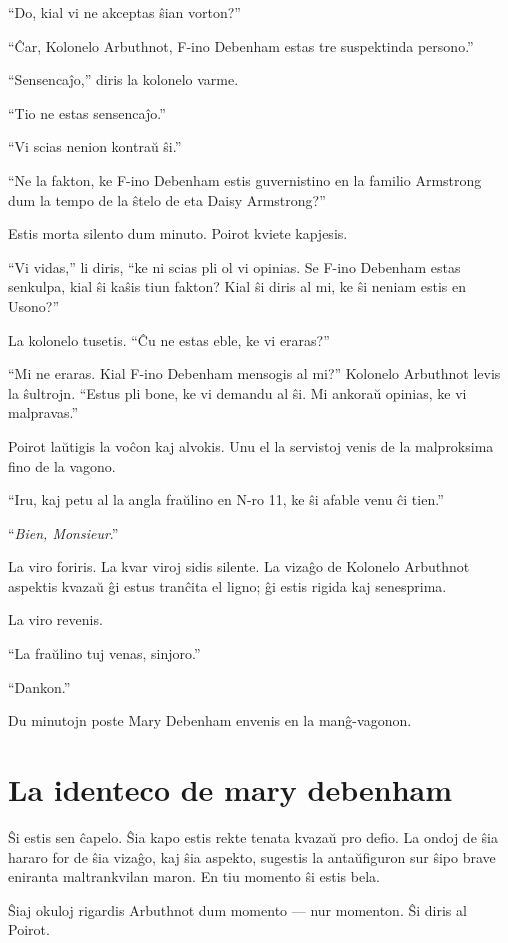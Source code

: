 ``Do, kial vi ne akceptas ŝian vorton?''

``Ĉar, Kolonelo Arbuthnot, F-ino Debenham estas tre suspektinda persono.''

``Sensencaĵo,'' diris la kolonelo varme.

``Tio ne estas sensencaĵo.''

``Vi scias nenion kontraŭ ŝi.''

``Ne la fakton, ke F-ino Debenham estis guvernistino en la familio Armstrong dum la tempo de la ŝtelo de eta Daisy Armstrong?''

Estis morta silento dum minuto. Poirot kviete kapjesis.

``Vi vidas,'' li diris, ``ke ni scias pli ol vi opinias. Se F-ino Debenham estas senkulpa, kial ŝi kaŝis tiun fakton? Kial ŝi diris al mi, ke ŝi neniam estis en Usono?''

La kolonelo tusetis. ``Ĉu ne estas eble, ke vi eraras?''

``Mi ne eraras. Kial F-ino Debenham mensogis al mi?'' Kolonelo Arbuthnot levis la ŝultrojn. ``Estus pli bone, ke vi demandu al ŝi. Mi ankoraŭ opinias, ke vi malpravas.''

Poirot laŭtigis la voĉon kaj alvokis. Unu el la servistoj venis de la malproksima fino de la vagono.

``Iru, kaj petu al la angla fraŭlino en N-ro 11, ke ŝi afable venu ĉi tien.''

``\emph{Bien, Monsieur}.''

La viro foriris. La kvar viroj sidis silente. La vizaĝo de Kolonelo Arbuthnot aspektis kvazaŭ ĝi estus tranĉita el ligno; ĝi estis rigida kaj senesprima.

La viro revenis.

``La fraŭlino tuj venas, sinjoro.''

``Dankon.''

Du minutojn poste Mary Debenham envenis en la manĝ-vagonon.

\chapter[La identeco de mary debenham]{La identeco de mary debenham}


Ŝi estis sen ĉapelo. Ŝia kapo estis rekte tenata kvazaŭ pro defio. La ondoj de ŝia hararo for de ŝia vizaĝo, kaj ŝia aspekto, sugestis la antaŭfiguron sur ŝipo brave eniranta maltrankvilan maron. En tiu momento ŝi estis bela.

Ŝiaj okuloj rigardis Arbuthnot dum momento --- nur momenton. Ŝi diris al Poirot.

